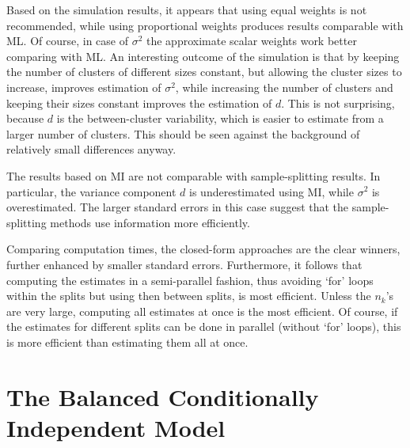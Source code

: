 \documentclass[11pt,a5paper,twoside]{book}
\begin{document}
{Based on the simulation results, it appears that  using equal weights is not recommended, while using proportional weights produces results comparable with ML. Of course, in case of $\sigma^2$ the approximate scalar weights  work better comparing with ML. An interesting outcome of the simulation is that by keeping the number of clusters of different sizes constant, but allowing the cluster sizes to increase, improves estimation of  $\sigma^2$, while increasing the number of clusters and keeping their sizes constant improves the estimation of  $d$. This is not surprising, because $d$ is the between-cluster variability, which is easier to estimate from a larger number of clusters. This should be seen against the background of relatively small differences anyway. 

The results based on MI are not comparable with sample-splitting results. In particular, the variance component $d$ is underestimated using MI, while $\sigma^2$ is overestimated.  The larger standard errors in this case suggest that the sample-splitting methods use information more efficiently. 

Comparing computation times, the closed-form approaches are the clear winners, further enhanced by smaller standard errors.  Furthermore, it follows that computing the estimates in a semi-parallel fashion, thus avoiding `for' loops within the splits but using then  between splits, is most efficient. Unless the $n_k$'s are very large, computing all  estimates at once is the most efficient. Of course, if the estimates for different splits can be done in parallel (without `for' loops), this is more efficient than estimating them all at once.



\setcounter{equation}{0}
\section{The Balanced Conditionally Independent Model\label{bcim}}

}
\end{document}
